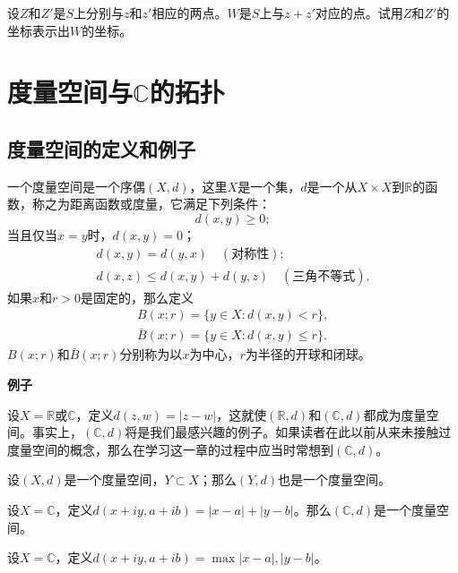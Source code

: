 \begin{exercise}
设$Z$和$Z'$是$S$上分别与$z$和$z'$相应的两点。$W$是$S$上与$z+z'$对应的点。试用$Z$和$Z'$的坐标表示出$W$的坐标。
\end{exercise}

\chapter{度量空间与$\mathbb{C}$的拓扑}\label{section00202}

\section{度量空间的定义和例子}\label{subsection0020201}
一个度量空间是一个序偶$(X, d)$，这里$X$是一个集，$d$是一个从$X \times X$到$\mathbb{R}$的函数，称之为距离函数或度量，它满足下列条件：
\[
d(x, y) \ge 0;
\]
当且仅当$x=y$时，$d(x, y)=0$；
\begin{gather*}
d(x, y) = d(y,x) \quad (\text{对称性});\\
d(x, z) \le d(x, y) + d(y, z)\quad (\text{三角不等式}).
\end{gather*}
如果$x$和$r > 0$是固定的，那么定义
\begin{gather*}
B(x; r) = \{y \in X: d(x, y) < r\},\\
\bar{B}(x; r) = \{y \in X: d(x, y) \le r\}.
\end{gather*}
$B(x; r)$和$\bar{B}(x; r)$分别称为以$x$为中心，$r$为半径的开球和闭球。

\textbf{例子}

\begin{example}\label{exam002020101}
设$X = \mathbb{R}$或$\mathbb{C}$，定义$d(z, w)=|z-w|$，这就使$(\mathbb{R}, d)$和$(\mathbb{C}, d)$都成为度量空间。事实上，$(\mathbb{C}, d)$将是我们最感兴趣的例子。如果读者在此以前从来未接触过度量空间的概念，那么在学习这一章的过程中应当时常想到$(\mathbb{C}, d)$。
\end{example}

\begin{example}\label{exam002020102}
设$(X, d)$是一个度量空间，$Y \subset X$；那么$(Y, d)$也是一个度量空间。
\end{example}

\begin{example}\label{exam002020103}
设$X = \mathbb{C}$，定义$d(x+iy, a+ib)=|x-a|+|y-b|$。那么$(\mathbb{C}, d)$是一个度量空间。
\end{example}

\begin{example}\label{exam002020104}
设$X = \mathbb{C}$，定义$d(x+iy, a+ib)=\max{|x-a|, |y-b|}$。
\end{example}


